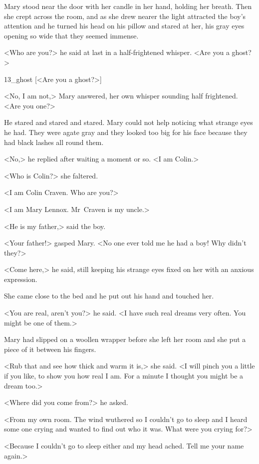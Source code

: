 Mary stood near the door with her candle in her hand, holding her breath. Then she crept across the room, and as she drew nearer the light attracted the boy's attention and he turned his head on his pillow and stared at her, his gray eyes opening so wide that they seemed immense.

<Who are you?> he said at last in a half-frightened whisper. <Are you a ghost?>

\begin{colorbigpic}
	[\basicscale]
	{13_ghost}
	[<Are you a ghost?>]
\end{colorbigpic}

<No, I am not,> Mary answered, her own whisper sounding half frightened. <Are you one?>

He stared and stared and stared. Mary could not help noticing what strange eyes he had. They were agate gray and they looked too big for his face because they had black lashes all round them.

<No,> he replied after waiting a moment or so. <I am Colin.>

<Who is Colin?> she faltered.

<I am Colin Craven. Who are you?>

<I am Mary Lennox. Mr~Craven is my uncle.>

<He is my father,> said the boy.

<Your father!> gasped Mary. <No one ever told me he had a boy! Why didn't they?>

<Come here,> he said, still keeping his strange eyes fixed on her with an anxious expression.

She came close to the bed and he put out his hand and touched her.

<You are real, aren't you?> he said. <I have such real dreams very often. You might be one of them.>

Mary had slipped on a woollen wrapper before she left her room and she put a piece of it between his fingers.

<Rub that and see how thick and warm it is,> she said. <I will pinch you a little if you like, to show you how real I am. For a minute I thought you might be a dream too.>

<Where did you come from?> he asked.

<From my own room. The wind wuthered so I couldn't go to sleep and I heard some one crying and wanted to find out who it was. What were you crying for?>

<Because I couldn't go to sleep either and my head ached. Tell me your name again.>

